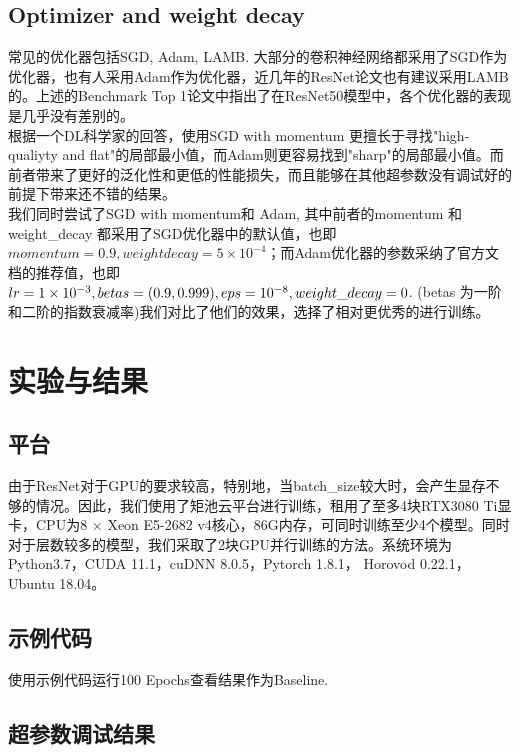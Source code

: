 \documentclass[hyperref, UTF8, 12pt]{article}
\theoremstyle{definition}
\begin{document}
\subsection{Optimizer and weight decay}
常见的优化器包括SGD, Adam, LAMB. 大部分的卷积神经网络都采用了SGD作为优化器，也有人采用Adam作为优化器，近几年的ResNet论文也有建议采用LAMB的。上述的Benchmark Top 1\cite{dosovitskiy2021image}论文中指出了在ResNet50模型中，各个优化器的表现是几乎没有差别的。\\
\indent
根据一个DL科学家的回答\cite{QuoraAnswer}，使用SGD with momentum 更擅长于寻找"high-qualiyty and flat"的局部最小值，而Adam则更容易找到"sharp"的局部最小值。而前者带来了更好的泛化性和更低的性能损失，而且能够在其他超参数没有调试好的前提下带来还不错的结果。\\
\indent
我们同时尝试了SGD with momentum和 Adam, 其中前者的momentum 和weight\_decay 都采用了SGD优化器中的默认值，也即$momentum = 0.9, weight decay = 5 \times 10 ^ {-4}$；而Adam优化器的参数采纳了官方文档的推荐值，也即$lr = 1 \times 10^{-3}, \space betas=(0.9, 0.999), \space eps = 10 ^ {-8}, \space weight\_decay = 0$. (betas 为一阶和二阶的指数衰减率)我们对比了他们的效果，选择了相对更优秀的进行训练。

\section{实验与结果}
\subsection{平台}
由于ResNet对于GPU的要求较高，特别地，当batch\_size较大时，会产生显存不够的情况。因此，我们使用了矩池云平台进行训练，租用了至多4块RTX3080 Ti显卡，CPU为8 $\times$ Xeon E5-2682 v4核心，86G内存，可同时训练至少4个模型。同时对于层数较多的模型，我们采取了2块GPU并行训练的方法。系统环境为Python3.7，CUDA 11.1，cuDNN 8.0.5，Pytorch 1.8.1， Horovod 0.22.1，Ubuntu 18.04。

\subsection{示例代码}
使用示例代码运行100 Epochs查看结果作为Baseline.

\subsection{超参数调试结果}
\end{document}
